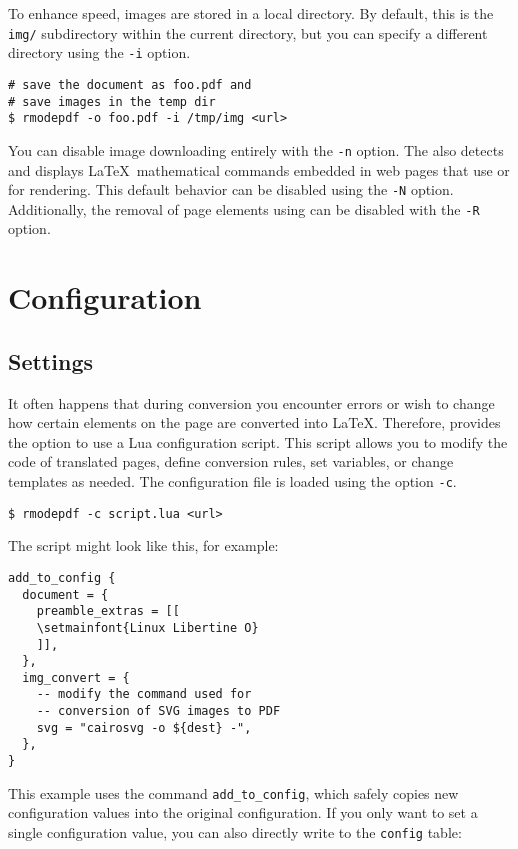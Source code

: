 \documentclass{ltugboat}
\begin{document}
To enhance speed, images are stored in a local directory. By default, this is
the \texttt{img/} subdirectory within the current directory, but you can
specify a different directory using the \texttt{-i} option. 

\begin{verbatim}
# save the document as foo.pdf and 
# save images in the temp dir
$ rmodepdf -o foo.pdf -i /tmp/img <url>
\end{verbatim}

You can disable image downloading entirely with the \texttt{-n} option. 
The  also detects and displays \LaTeX\ mathematical commands
embedded in web pages that use  or  for
rendering. This default behavior can be disabled using the \texttt{-N} option.
Additionally, the removal of page elements using  can be
disabled with the \texttt{-R} option.




\section{Configuration}

\subsection{Settings}

It often happens that during conversion you encounter errors or wish to change
how certain elements on the page are converted into \LaTeX. Therefore,
 provides the option to use a Lua configuration script. This
script allows you to modify the code of translated pages, define conversion
rules, set variables, or change templates as needed. The configuration file is
loaded using the option \texttt{-c}.

\begin{verbatim}
$ rmodepdf -c script.lua <url>
\end{verbatim}

The script might look like this, for example:

\begin{verbatim}
add_to_config {
  document = {
    preamble_extras = [[
    \setmainfont{Linux Libertine O}
    ]],
  },
  img_convert = {
    -- modify the command used for 
    -- conversion of SVG images to PDF
    svg = "cairosvg -o ${dest} -",
  },
}
\end{verbatim}


This example uses the command \texttt{add\allowbreak\_to\allowbreak\_config}, which safely copies new
configuration values into the original configuration. If you only want to set a
single configuration value, you can also directly write to the \texttt{config}
table:
\end{document}
